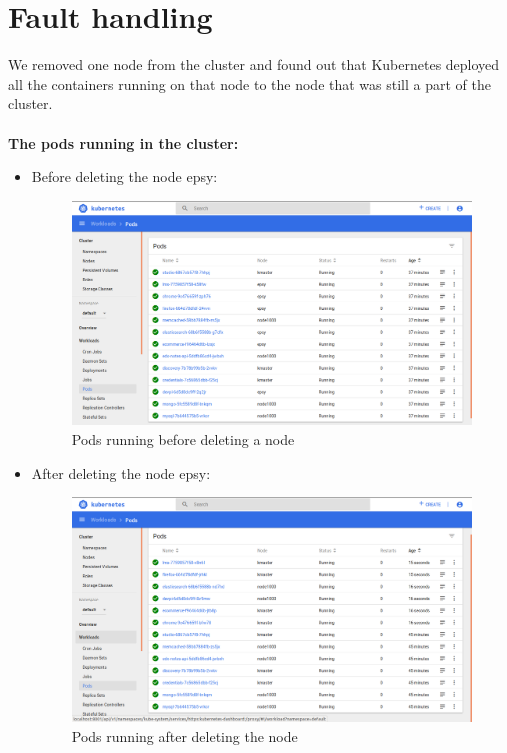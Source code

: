 \documentclass[12pt]{report}
\begin{document}
\section{Fault handling}
We removed one node from the cluster and found out that Kubernetes deployed all the containers running on that node to the node that was still a part of the cluster.\\\\
\textbf{The pods running in the cluster:}
\begin{itemize}
	\item Before deleting the node epsy: 
		\begin{figure}[h!]
			\begin{center}
				\includegraphics[totalheight=0.32\textheight]{podswithepsy}
				\caption{Pods running before deleting a node}
			\end{center}
		\end{figure}
	\item After deleting the node epsy:
		\begin{figure}[h!]
			\begin{center}
				\includegraphics[totalheight=0.32\textheight]{podswithoutepsy}
				\caption{Pods running after deleting the node}
			\end{center}
		\end{figure}
\end{itemize}
\end{document}
